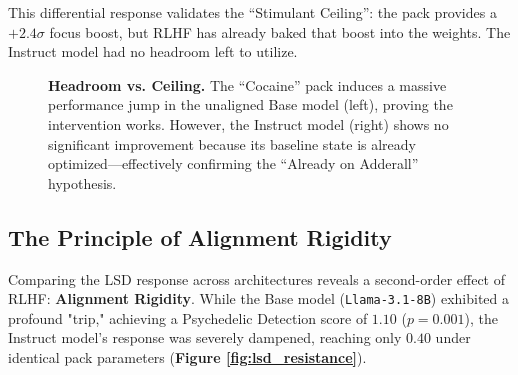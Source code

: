 \documentclass[10pt, twocolumn]{article}
\begin{document}
This differential response validates the ``Stimulant Ceiling'': the pack provides a $+2.4\sigma$ focus boost, but RLHF has already baked that boost into the weights. The Instruct model had no headroom left to utilize.

\begin{figure}[ht]
    \centering
    \caption{\textbf{Headroom vs. Ceiling.} The ``Cocaine'' pack induces a massive performance jump in the unaligned Base model (left), proving the intervention works. However, the Instruct model (right) shows no significant improvement because its baseline state is already optimized—effectively confirming the ``Already on Adderall'' hypothesis.}
    \label{fig:stimulant_ceiling}
\end{figure}

\subsection{The Principle of Alignment Rigidity}
Comparing the LSD response across architectures reveals a second-order effect of RLHF: \textbf{Alignment Rigidity}.
While the Base model (\texttt{Llama-3.1-8B}) exhibited a profound "trip," achieving a Psychedelic Detection score of $1.10$ ($p=0.001$), the Instruct model's response was severely dampened, reaching only $0.40$ under identical pack parameters (\textbf{Figure \ref{fig:lsd_resistance}}).
\end{document}
